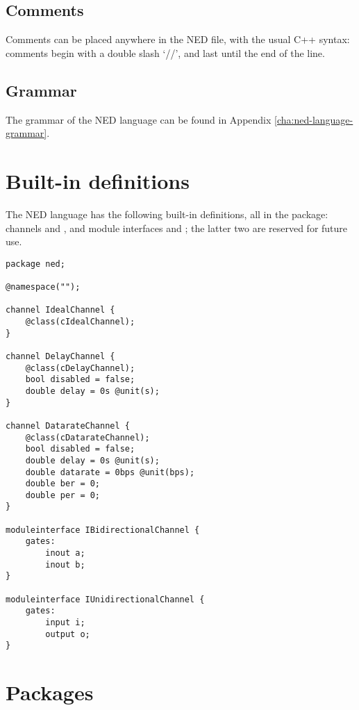 \subsection{Comments}

Comments can be placed anywhere in the NED file, with the usual C++
syntax: comments begin with a double slash `//', and last until
the end of the line.

\subsection{Grammar}

The grammar of the NED language can be found in Appendix
\ref{cha:ned-language-grammar}.

\section{Built-in definitions}
\label{ch-ned-ref:sec:built-in-defs}

The NED language has the following built-in definitions, all in the 
package: channels  and , and module
interfaces  and ; the
latter two are reserved for future use.

\begin{verbatim}
package ned;

@namespace("");

channel IdealChannel {
    @class(cIdealChannel);
}

channel DelayChannel {
    @class(cDelayChannel);
    bool disabled = false;
    double delay = 0s @unit(s);
}

channel DatarateChannel {
    @class(cDatarateChannel);
    bool disabled = false;
    double delay = 0s @unit(s);
    double datarate = 0bps @unit(bps);
    double ber = 0;
    double per = 0;
}

moduleinterface IBidirectionalChannel {
    gates:
        inout a;
        inout b;
}

moduleinterface IUnidirectionalChannel {
    gates:
        input i;
        output o;
}
\end{verbatim}



\section{Packages}

